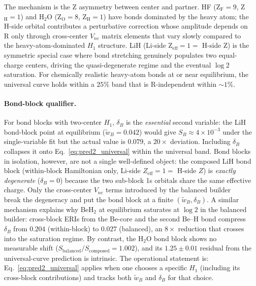 \documentclass[twocolumn,pra,amsmath,amssymb,superscriptaddress]{revtex4-2}
\begin{document}
The mechanism is the Z asymmetry between center and partner.
HF (Z$_{\mathrm{F}}=9$, Z$_{\mathrm{H}}=1$) and H$_2$O
(Z$_{\mathrm{O}}=8$, Z$_{\mathrm{H}}=1$) have bonds dominated
by the heavy atom; the H-side orbital contributes a
perturbative correction whose amplitude depends on R only
through cross-center $V_{ne}$ matrix elements that vary
slowly compared to the heavy-atom-dominated $H_1$ structure.
LiH (Li-side Z$_{\mathrm{eff}}=1=$ H-side Z) is the
symmetric special case where bond stretching genuinely
populates two equal-charge centers, driving the
quasi-degenerate regime and the eventual $\log 2$ saturation.
For chemically realistic heavy-atom bonds at or near
equilibrium, the universal curve holds within a $25\%$ band
that is R-independent within $\sim 1\%$.

\paragraph*{Bond-block qualifier.}  For bond blocks with
two-center $H_1$, $\delta_B$ is the \emph{essential} second
variable: the LiH bond-block point at equilibrium
($\tilde{w}_B = 0.042$) would give $S_B \approx 4\times 10^{-3}$
under the single-variable fit but the actual value is $0.079$,
a $20\times$ deviation.  Including $\delta_B$ collapses it onto
Eq.~\eqref{eq:pred2_universal} within the universal band.
Bond blocks in isolation, however, are not a single
well-defined object: the composed LiH bond block (within-block
Hamiltonian only, Li-side $Z_{\mathrm{eff}}=1 = $ H-side $Z$)
is \emph{exactly degenerate} ($\delta_B=0$) because the two
sub-block 1s orbitals share the same effective charge.  Only
the cross-center $V_{ne}$ terms introduced by the balanced
builder~\cite{GeoVac_Paper19} break the degeneracy and put the
bond block at a finite $(\tilde{w}_B,\delta_B)$.  A similar
mechanism explains why BeH$_2$ at equilibrium saturates at
$\log 2$ in the balanced builder: cross-block ERIs from the
Be-core and the second Be--H bond compress $\delta_B$ from
$0.204$ (within-block) to $0.027$ (balanced), an $8\times$
reduction that crosses into the saturation regime.  By
contrast, the H$_2$O bond block shows no measurable shift
($S_{\mathrm{balanced}}/S_{\mathrm{composed}} = 1.002$), and its
$1.25\pm 0.01$ residual from the universal-curve prediction is
intrinsic.  The operational statement is:
Eq.~\eqref{eq:pred2_universal} applies when one chooses a
specific $H_1$ (including its cross-block contributions) and
tracks both $\tilde{w}_B$ and $\delta_B$ for that choice.
\end{document}
